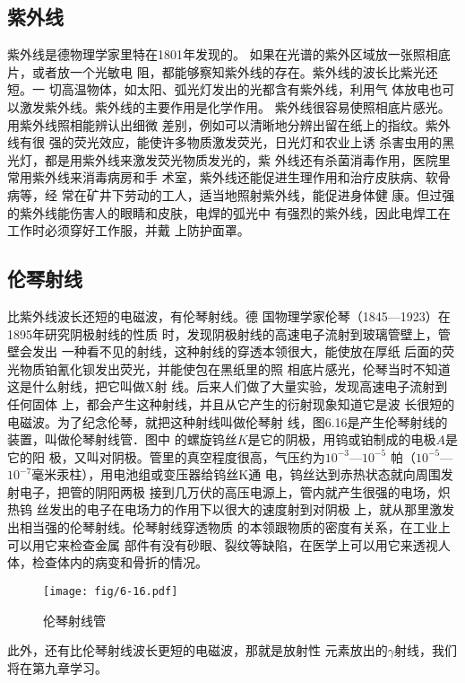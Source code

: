 \subsection{紫外线}

紫外线是德物理学家里特在1801年发现的。
如果在光谱的紫外区域放一张照相底片，或者放一个光敏电
阻，都能够察知紫外线的存在。紫外线的波长比紫光还短。一
切高温物体，如太阳、弧光灯发出的光都含有紫外线，利用气
体放电也可以激发紫外线。紫外线的主要作用是化学作用。
紫外线很容易使照相底片感光。用紫外线照相能辨认出细微
差别，例如可以清晰地分辨出留在纸上的指纹。紫外线有很
强的荧光效应，能使许多物质激发荧光，日光灯和农业上诱
杀害虫用的黑光灯，都是用紫外线来激发荧光物质发光的，紫
外线还有杀菌消毒作用，医院里常用紫外线来消毒病房和手
术室，紫外线还能促进生理作用和治疗皮肤病、软骨病等，经
常在矿井下劳动的工人，适当地照射紫外线，能促进身体健
康。但过强的紫外线能伤害人的眼睛和皮肤，电焊的弧光中
有强烈的紫外线，因此电焊工在工作时必须穿好工作服，并戴
上防护面罩。

\subsection{伦琴射线}
比紫外线波长还短的电磁波，有伦琴射线。德
国物理学家伦琴（1845—1923）在1895年研究阴极射线的性质
时，发现阴极射线的高速电子流射到玻璃管壁上，管壁会发出
一种看不见的射线，这种射线的穿透本领很大，能使放在厚纸
后面的荧光物质铂氰化钡发出荧光，并能使包在黑纸里的照
相底片感光，伦琴当时不知道这是什么射线，把它叫做X射
线。后来人们做了大量实验，发现高速电子流射到任何固体
上，都会产生这种射线，并且从它产生的衍射现象知道它是波
长很短的电磁波。为了纪念伦琴，就把这种射线叫做伦琴射
线，图6.16是产生伦琴射线的装置，叫做伦琴射线管．图中
的螺旋钨丝$K$是它的阴极，用钨或铂制成的电极$A$是它的阳
极，又叫对阴极。管里的真空程度很高，气压约为$10^{-3}$—$10^{-5}$
帕（$10^{-5}$—$10^{-7}$毫米汞柱），用电池组或变压器给钨丝K通
电，钨丝达到赤热状态就向周围发射电子，把管的阴阳两极
接到几万伏的高压电源上，管内就产生很强的电场，炽热钨
丝发出的电子在电场力的作用下以很大的速度射到对阴极
上，就从那里激发出相当强的伦琴射线。伦琴射线穿透物质
的本领跟物质的密度有关系，在工业上可以用它来检查金属
部件有没有砂眼、裂纹等缺陷，在医学上可以用它来透视人
体，检查体内的病变和骨折的情况。
\begin{figure}[htp]\centering
    \texttt{[image: fig/6-16.pdf]}
    \caption{伦琴射线管}
    \end{figure}

此外，还有比伦琴射线波长更短的电磁波，那就是放射性
元素放出的$\gamma$射线，我们将在第九章学习。

